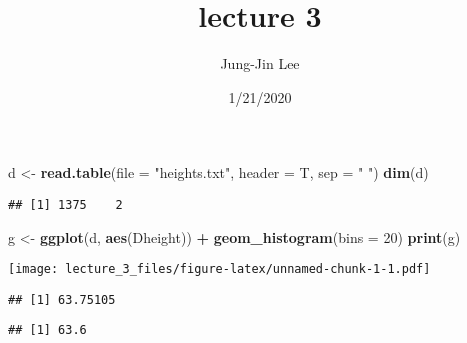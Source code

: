 \documentclass[]{article}
\title{lecture 3}
\author{Jung-Jin Lee}
\date{1/21/2020}
\newenvironment{Shaded}{\begin{snugshade}}{\end{snugshade}}
\newcommand{\DataTypeTok}[1]{\textcolor[rgb]{0.13,0.29,0.53}{#1}}
\newcommand{\DecValTok}[1]{\textcolor[rgb]{0.00,0.00,0.81}{#1}}
\newcommand{\KeywordTok}[1]{\textcolor[rgb]{0.13,0.29,0.53}{\textbf{#1}}}
\newcommand{\NormalTok}[1]{#1}
\newcommand{\OperatorTok}[1]{\textcolor[rgb]{0.81,0.36,0.00}{\textbf{#1}}}
\newcommand{\StringTok}[1]{\textcolor[rgb]{0.31,0.60,0.02}{#1}}
\begin{document}
\maketitle

\begin{Shaded}
\begin{Highlighting}[]
\NormalTok{d <-}\StringTok{ }\KeywordTok{read.table}\NormalTok{(}\DataTypeTok{file =} \StringTok{"heights.txt"}\NormalTok{, }\DataTypeTok{header =}\NormalTok{ T, }\DataTypeTok{sep =} \StringTok{" "}\NormalTok{)}
\KeywordTok{dim}\NormalTok{(d)}
\end{Highlighting}
\end{Shaded}

\begin{verbatim}
## [1] 1375    2
\end{verbatim}

\begin{Shaded}
\begin{Highlighting}[]
\NormalTok{g <-}\StringTok{ }\KeywordTok{ggplot}\NormalTok{(d, }\KeywordTok{aes}\NormalTok{(Dheight)) }\OperatorTok{+}\StringTok{ }\KeywordTok{geom_histogram}\NormalTok{(}\DataTypeTok{bins =} \DecValTok{20}\NormalTok{)}
\KeywordTok{print}\NormalTok{(g)  }
\end{Highlighting}
\end{Shaded}

\texttt{[image: lecture\_3\_files/figure-latex/unnamed-chunk-1-1.pdf]}

\begin{Shaded}
\end{Shaded}

\begin{verbatim}
## [1] 63.75105
\end{verbatim}

\begin{Shaded}
\end{Shaded}

\begin{verbatim}
## [1] 63.6
\end{verbatim}

\begin{Shaded}
\end{Shaded}
\end{document}
